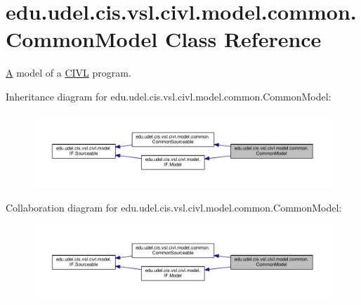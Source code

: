 \hypertarget{classedu_1_1udel_1_1cis_1_1vsl_1_1civl_1_1model_1_1common_1_1CommonModel}{}\section{edu.\+udel.\+cis.\+vsl.\+civl.\+model.\+common.\+Common\+Model Class Reference}
\label{classedu_1_1udel_1_1cis_1_1vsl_1_1civl_1_1model_1_1common_1_1CommonModel}


\hyperlink{structA}{A} model of a \hyperlink{classedu_1_1udel_1_1cis_1_1vsl_1_1civl_1_1CIVL}{C\+I\+V\+L} program.  




Inheritance diagram for edu.\+udel.\+cis.\+vsl.\+civl.\+model.\+common.\+Common\+Model\+:
\nopagebreak
\begin{figure}[H]
\begin{center}
\leavevmode
\includegraphics[width=350pt]{classedu_1_1udel_1_1cis_1_1vsl_1_1civl_1_1model_1_1common_1_1CommonModel__inherit__graph}
\end{center}
\end{figure}


Collaboration diagram for edu.\+udel.\+cis.\+vsl.\+civl.\+model.\+common.\+Common\+Model\+:
\nopagebreak
\begin{figure}[H]
\begin{center}
\leavevmode
\includegraphics[width=350pt]{classedu_1_1udel_1_1cis_1_1vsl_1_1civl_1_1model_1_1common_1_1CommonModel__coll__graph}
\end{center}
\end{figure}
